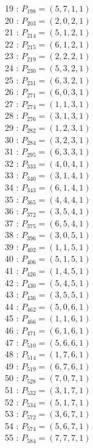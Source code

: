 \documentclass{article}
\begin{document}
{\begin{multicols}{2}
19 : $P_{198}=( 5, 7, 1, 1 )$\\
20 : $P_{203}=( 2, 0, 2, 1 )$\\
21 : $P_{214}=( 5, 1, 2, 1 )$\\
22 : $P_{215}=( 6, 1, 2, 1 )$\\
23 : $P_{219}=( 2, 2, 2, 1 )$\\
24 : $P_{230}=( 5, 3, 2, 1 )$\\
25 : $P_{231}=( 6, 3, 2, 1 )$\\
26 : $P_{271}=( 6, 0, 3, 1 )$\\
27 : $P_{274}=( 1, 1, 3, 1 )$\\
28 : $P_{276}=( 3, 1, 3, 1 )$\\
29 : $P_{282}=( 1, 2, 3, 1 )$\\
30 : $P_{284}=( 3, 2, 3, 1 )$\\
31 : $P_{295}=( 6, 3, 3, 1 )$\\
32 : $P_{333}=( 4, 0, 4, 1 )$\\
33 : $P_{340}=( 3, 1, 4, 1 )$\\
34 : $P_{343}=( 6, 1, 4, 1 )$\\
35 : $P_{365}=( 4, 4, 4, 1 )$\\
36 : $P_{372}=( 3, 5, 4, 1 )$\\
37 : $P_{375}=( 6, 5, 4, 1 )$\\
38 : $P_{396}=( 3, 0, 5, 1 )$\\
39 : $P_{402}=( 1, 1, 5, 1 )$\\
40 : $P_{406}=( 5, 1, 5, 1 )$\\
41 : $P_{426}=( 1, 4, 5, 1 )$\\
42 : $P_{430}=( 5, 4, 5, 1 )$\\
43 : $P_{436}=( 3, 5, 5, 1 )$\\
44 : $P_{462}=( 5, 0, 6, 1 )$\\
45 : $P_{466}=( 1, 1, 6, 1 )$\\
46 : $P_{471}=( 6, 1, 6, 1 )$\\
47 : $P_{510}=( 5, 6, 6, 1 )$\\
48 : $P_{514}=( 1, 7, 6, 1 )$\\
49 : $P_{519}=( 6, 7, 6, 1 )$\\
50 : $P_{528}=( 7, 0, 7, 1 )$\\
51 : $P_{532}=( 3, 1, 7, 1 )$\\
52 : $P_{534}=( 5, 1, 7, 1 )$\\
53 : $P_{572}=( 3, 6, 7, 1 )$\\
54 : $P_{574}=( 5, 6, 7, 1 )$\\
55 : $P_{584}=( 7, 7, 7, 1 )$\\
\end{multicols}
}
\end{document}
